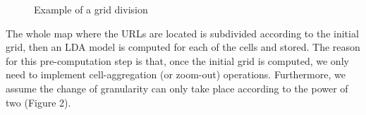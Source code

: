 \begin{figure}[h]
	\caption{Example of a grid division}
\end{figure}

The whole map where the URLs are located is subdivided according to the initial grid, then an LDA model is computed for each of the cells and stored. The reason for this pre-computation step is that, once the initial grid is computed, we only need to implement cell-aggregation (or zoom-out) operations. Furthermore, we assume the change of granularity can only take place according to the power of two (Figure 2).\\

